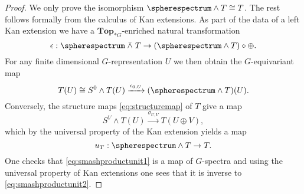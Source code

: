 \begin{proof}
We only prove the isomorphism $\spherespectrum \wedge T\cong T$. The rest
follows formally from the calculus of Kan extensions. As part of the data of a
left Kan extension we have a $\mathbf{Top}_{\ast G}$-enriched natural transformation
\[
\epsilon: \spherespectrum\;\bar{\wedge}\;T\to (\spherespectrum\wedge T)\circ \oplus.
\]
For any finite dimensional $G$-representation $U$ we then obtain the $G$-equivariant map
\begin{equation}\label{eq:smashproductunit1}
T(U)\cong S^0\wedge T(U)\xrightarrow{\epsilon_{0,U}} (\spherespectrum\wedge T)(U).
\end{equation}
Conversely, the structure maps \eqref{eq:structuremap} of $T$ give a map
\[
S^V\wedge T(U)\xrightarrow{\sigma_{U, V}} T(U\oplus V),
\]
which by the universal property of the Kan extension yields a map
\begin{equation}\label{eq:smashproductunit2}
u_T:\spherespectrum \wedge T\to T.
\end{equation}
One checks that \eqref{eq:smashproductunit1} is a map of $G$-spectra and using
the universal property of Kan extensions one sees that it is inverse to
\eqref{eq:smashproductunit2}. 
\end{proof}



